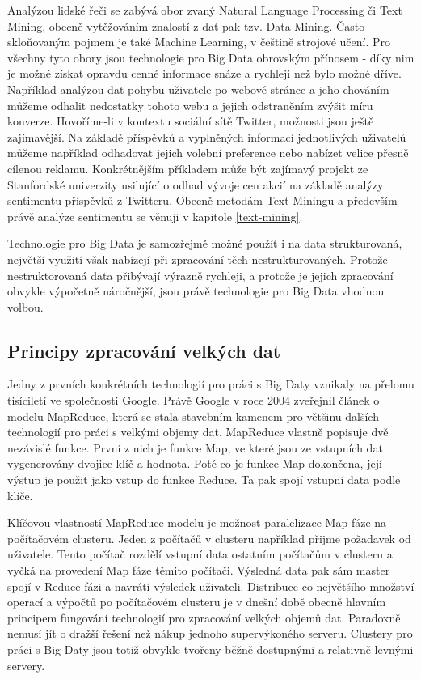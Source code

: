 \documentclass[thesis=B,czech]{FITthesis}[2012/06/26]
\begin{document}
	Analýzou lidské řeči se zabývá obor zvaný Natural Language Processing či Text Mining, obecně vytěžováním znalostí z dat pak tzv. Data Mining. Často skloňovaným pojmem je také Machine Learning, v češtině strojové učení. Pro všechny tyto obory jsou technologie pro Big Data obrovským přínosem - díky nim je možné získat opravdu cenné informace snáze a rychleji než bylo možné dříve. Například analýzou dat pohybu uživatele po webové stránce a jeho chováním můžeme odhalit nedostatky tohoto webu a jejich odstraněním zvýšit míru konverze. Hovoříme-li v kontextu sociální sítě Twitter, možnosti jsou ještě zajímavější. Na základě příspěvků a vyplněných informací jednotlivých uživatelů můžeme například odhadovat jejich volební preference nebo nabízet velice přesně cílenou reklamu. Konkrétnějším příkladem může být zajímavý projekt ze Stanfordské univerzity usilující o odhad vývoje cen akcií na základě analýzy sentimentu příspěvků z Twitteru\cite{stock-stanford}. Obecně metodám Text Miningu a především právě analýze sentimentu se věnuji v kapitole \ref{text-mining}.  

	Technologie pro Big Data je samozřejmě možné použít i na data strukturovaná, největší využití však nabízejí při zpracování těch nestrukturovaných. Protože nestruktorovaná data přibývají výrazně rychleji\cite{structured-unstructured}, a protože je jejich zpracování obvykle výpočetně náročnější, jsou právě technologie pro Big Data vhodnou volbou. 
 
	
\subsection{Principy zpracování velkých dat}
	Jedny z prvních konkrétních technologií pro práci s Big Daty vznikaly na přelomu tisíciletí ve společnosti Google. Právě Google v roce 2004 zveřejnil článek o modelu MapReduce\cite{mapreduce-google}, která se stala stavebním kamenem pro většinu dalších technologií pro práci s velkými objemy dat. MapReduce vlastně popisuje dvě nezávislé funkce. První z nich je funkce Map, ve které jsou ze vstupních dat vygenerovány dvojice klíč a hodnota. Poté co je funkce Map dokončena, její výstup je použit jako vstup do funkce Reduce. Ta pak spojí vstupní data podle klíče\cite{mapreduce-description}. 
	
	Klíčovou vlastností MapReduce modelu je možnost paralelizace Map fáze na počítačovém clusteru. Jeden z počítačů v clusteru například přijme požadavek od uživatele. Tento počítač rozdělí vstupní data ostatním počítačům v clusteru a vyčká na provedení Map fáze těmito počítači. Výsledná data pak sám master spojí v Reduce fázi a navrátí výsledek uživateli. Distribuce co největšího množství operací a výpočtů po počítačovém clusteru je v dnešní době obecně hlavním principem fungování technologií pro zpracování velkých objemů dat. Paradoxně nemusí jít o dražší řešení než nákup jednoho supervýkoného serveru. Clustery pro práci s Big Daty jsou totiž obvykle tvořeny běžně dostupnými a relativně levnými servery. 
	
\end{document}

